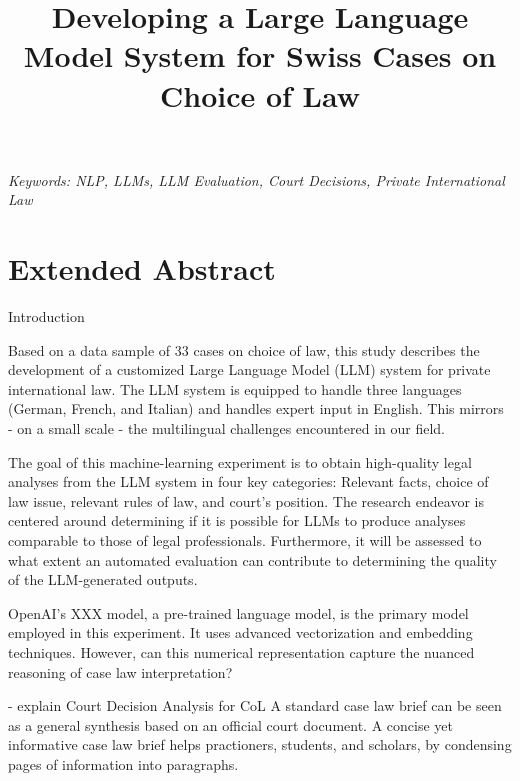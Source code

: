 \documentclass[a4paper,12pt]{article}
\title{Developing a Large Language Model System for Swiss Cases on Choice of Law}
\date{}
\begin{document}
\maketitle
\thispagestyle{fancy}

\begin{center}
\textit{Keywords: NLP, LLMs, LLM Evaluation, Court Decisions, Private International Law}
\newline
\end{center}

\section*{Extended Abstract}

Introduction

Based on a data sample of 33 cases on choice of law, this study describes the development of a customized Large Language Model (LLM) system for private international law. The LLM system is equipped to handle three languages (German, French, and Italian) and handles expert input in English. This mirrors - on a small scale - the multilingual challenges encountered in our field.

The goal of this machine-learning experiment is to obtain high-quality legal analyses from the LLM system in four key categories: Relevant facts, choice of law issue, relevant rules of law, and court's position. The research endeavor is centered around determining if it is possible for LLMs to produce analyses comparable to those of legal professionals. Furthermore, it will be assessed to what extent an automated evaluation can contribute to determining the quality of the LLM-generated outputs.

OpenAI's XXX model, a pre-trained language model, is the primary model employed in this experiment. It uses advanced vectorization and embedding techniques. However, can this numerical representation capture the nuanced reasoning of case law interpretation?

- explain Court Decision Analysis for CoL
A standard case law brief can be seen as a general synthesis based on an official court document. A concise yet informative case law brief helps practioners, students, and scholars, by condensing pages of information into paragraphs. 
\end{document}
